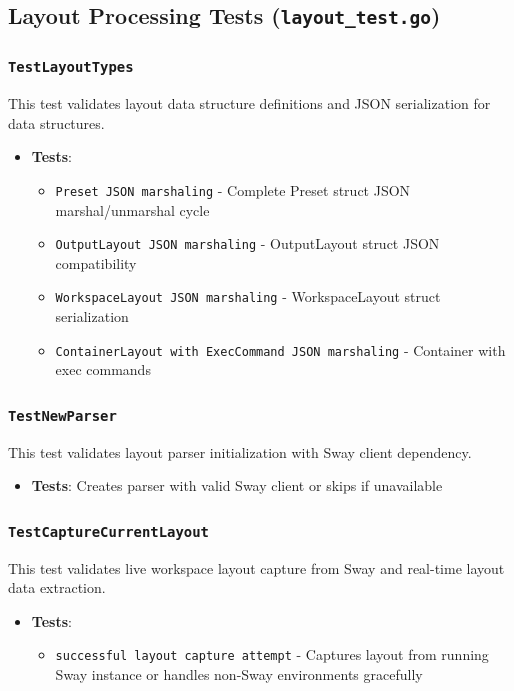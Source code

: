 \subsection{Layout Processing Tests (\texttt{layout\_test.go})}

\subsubsection*{\texttt{TestLayoutTypes}}
This test validates layout data structure definitions and JSON serialization for data structures.
\begin{itemize}
    \item \textbf{Tests}:
    \begin{itemize}
        \item \texttt{Preset JSON marshaling} - Complete Preset struct JSON marshal/unmarshal cycle
        \item \texttt{OutputLayout JSON marshaling} - OutputLayout struct JSON compatibility
        \item \texttt{WorkspaceLayout JSON marshaling} - WorkspaceLayout struct serialization
        \item \texttt{ContainerLayout with ExecCommand JSON marshaling} - Container with exec commands
    \end{itemize}
\end{itemize}

\subsubsection*{\texttt{TestNewParser}}
This test validates layout parser initialization with Sway client dependency.
\begin{itemize}
    \item \textbf{Tests}: Creates parser with valid Sway client or skips if unavailable
\end{itemize}

\subsubsection*{\texttt{TestCaptureCurrentLayout}}
This test validates live workspace layout capture from Sway and real-time layout data extraction.
\begin{itemize}
    \item \textbf{Tests}:
    \begin{itemize}
        \item \texttt{successful layout capture attempt} - Captures layout from running Sway instance or handles non-Sway environments gracefully
    \end{itemize}
\end{itemize}
